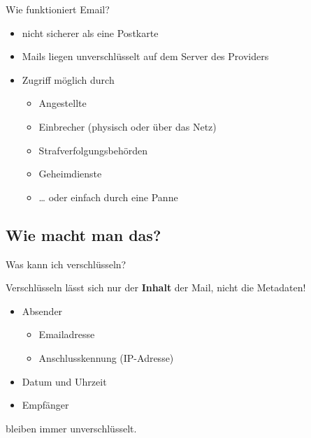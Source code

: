 \begin{frame}{Wie funktioniert Email?}
  \begin{itemize}
    \item nicht sicherer als eine Postkarte
    \item Mails liegen unverschlüsselt auf dem Server des Providers
    \item Zugriff möglich durch
      \begin{itemize}
	\item Angestellte
	\item Einbrecher (physisch oder über das Netz)
	\item Strafverfolgungsbehörden
	\item Geheimdienste
	\item … oder einfach durch eine Panne
      \end{itemize}
  \end{itemize}

\end{frame}

\subsection{Wie macht man das?}

\begin{frame}{Was kann ich verschlüsseln?}
  \begin{block}{}
    Verschlüsseln lässt sich nur der \textbf{Inhalt} der Mail, nicht die
    Metadaten!
  \end{block}

  \begin{itemize}
    \item Absender
      \begin{itemize}
	\item Emailadresse
	\item Anschlusskennung (IP-Adresse)
      \end{itemize}
    \item Datum und Uhrzeit
    \item Empfänger
  \end{itemize}

  bleiben immer unverschlüsselt.

\end{frame}

